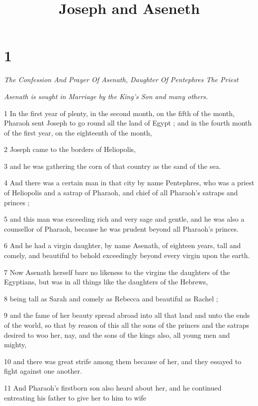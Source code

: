 


\title{Joseph and Aseneth}

\chapter{1}

\par \textit{The Confession And Prayer Of Asenath, Daughter Of Pentephres The Priest}

\par \textit{Asenath is sought in Marriage by the King's Son and many others.}

1 In the first year of plenty, in the second month, on the fifth of the month, Pharaoh sent Joseph to go round all the land of Egypt ; and in the fourth month of the first year, on the eighteenth of the month, 

2 Joseph came to the borders of Heliopolis, 

3 and he was gathering the corn of that country as the sand of the sea. 

4 And there was a certain man in that city by name Pentephres, who was a priest of Heliopolis and a satrap of Pharaoh, and chief of all Pharaoh's satraps and princes ; 

5 and this man was exceeding rich and very sage and gentle, and he was also a counsellor of Pharaoh, because he was prudent beyond all Pharaoh's princes. 

6 And he had a virgin daughter, by name Asenath, of eighteen years, tall and comely, and beautiful to behold exceedingly beyond every virgin upon the earth. 

7 Now Asenath herself bare no likeness to the virgins the daughters of the Egyptians, but was in all things like the daughters of the Hebrews, 

8 being tall as Sarah and comely as Rebecca and beautiful as Rachel ; 

9 and the fame of her beauty spread abroad into all that land and unto the ends of the world, so that by reason of this all the sons of the princes and the satraps desired to woo her, nay, and the sons of the kings also, all young men and mighty, 

10 and there was great strife among them because of her, and they essayed to fight against one another. 

11 And Pharaoh's firstborn son also heard about her, and he continued entreating his father to give her to him to wife 

